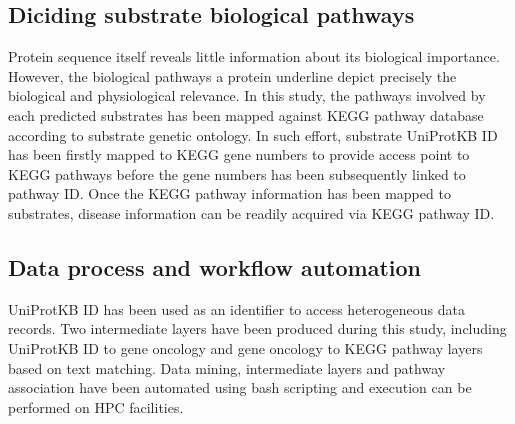 \subsection {Diciding substrate biological pathways}
Protein sequence itself reveals little information about its biological importance. However, the biological pathways a protein underline depict precisely the biological and physiological relevance. In this study, the pathways involved by each predicted substrates has been mapped against KEGG pathway database \cite{Kanehisa01012014} according to substrate genetic ontology. In such effort, substrate UniProtKB ID has been firstly mapped to KEGG gene numbers to provide access point to KEGG pathways before the gene numbers has been subsequently linked to pathway ID. Once the KEGG pathway information has been mapped to substrates, disease information can be readily acquired via KEGG pathway ID. 
\\
\subsection{Data process and workflow automation}
UniProtKB ID has been used as an identifier to access heterogeneous data records. Two intermediate layers have been produced during this study, including UniProtKB ID to gene oncology and gene oncology to KEGG pathway layers based on text matching. Data mining, intermediate layers and pathway association have been automated using bash scripting and execution can be performed on HPC facilities. 
\\


